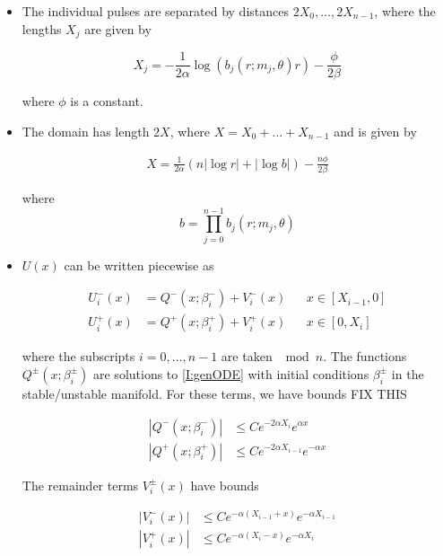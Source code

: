 \documentclass[thesis.tex]{subfiles}
\begin{document}
\begin{theorem}
\begin{itemize}
\item The individual pulses are separated by distances $2 X_0, \dots, 2 X_{n-1}$, where the lengths $X_j$ are given by 

\begin{equation}\label{Xj}
X_j = -\frac{1}{2\alpha}\log(b_j(r; m_j, \theta) r) - \frac{\phi}{2 \beta} 
\end{equation}

where $\phi$ is a constant.

\item The domain has length $2X$, where $X = X_0 + \dots + X_{n-1}$ and is given by

\begin{align}
X = \frac{1}{2\alpha} (n |\log r| + |\log b| ) - \frac{n \phi}{2 \beta}
\end{align}

where 
\begin{equation}
b = \prod_{j=0}^{n-1} b_j(r; m_j, \theta)
\end{equation}

\item $U(x)$ can be written piecewise as

\begin{align}
U_i^-(x) &= Q^-(x; \beta_i^-) + V_i^-(x) && x \in [X_{i-1}, 0] \\
U_i^+(x) &= Q^+(x; \beta_i^+) + V_i^+(x) && x \in [0, X_i]
\end{align}

where the subscripts $i = 0, \dots, n-1$ are taken $\mod n$. The functions $Q^\pm(x; \beta_i^\pm)$ are solutions to \eqref{I:genODE} with initial conditions $\beta_i^\pm$ in the stable/unstable manifold. For these terms, we have bounds FIX THIS

\begin{align*}
|Q^-(x; \beta_i^-)| &\leq C e^{-2 \alpha X_i} e^{\alpha x} \\
|Q^+(x; \beta_i^+)| &\leq C e^{-2 \alpha X_{i-1}} e^{-\alpha x}
\end{align*} 

The remainder terms $V_i^\pm(x)$ have bounds

\begin{align}
|V_i^-(x)| &\leq C e^{-\alpha(X_{i-1} + x)}e^{-\alpha X_{i-1}} \\
|V_i^+(x)| &\leq C e^{-\alpha(X_i - x)}e^{-\alpha X_i} 
\end{align} 

\end{itemize}


\end{theorem}
\end{document}

